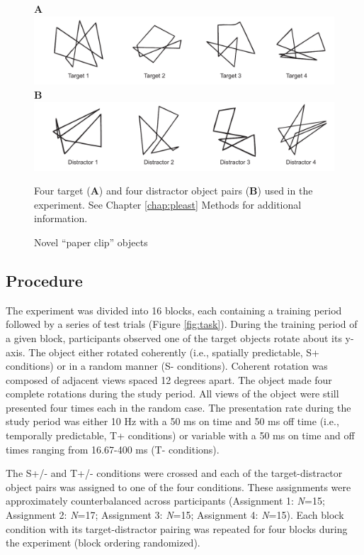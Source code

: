 \documentclass[dwyatte_dissertation.tex]{subfiles}
\begin{document}
\begin{figure}[h!]
\textbf{A} \\
\includegraphics[width=160mm]{figs/bpleast/paperclip_targets.pdf} \\
\textbf{B} \\
\includegraphics[width=160mm]{figs/bpleast/paperclip_distractors.pdf} \\
\caption{Novel ``paper clip'' objects}{Four target (\textbf{A}) and four distractor object pairs (\textbf{B}) used in the experiment. See Chapter \ref{chap:pleast} Methods for additional information.}
\label{fig:paperclip}
\end{figure}

\subsection{Procedure}
The experiment was divided into 16 blocks, each containing a training period followed by a series of test trials (Figure \ref{fig:task}). During the training period of a given block, participants observed one of the target objects rotate about its y-axis. The object either rotated coherently (i.e., spatially predictable, S+ conditions) or in a random manner (S- conditions). Coherent rotation was composed of adjacent views spaced 12 degrees apart. The object made four complete rotations during the study period. All views of the object were still presented four times each in the random case. The presentation rate during the study period was either 10 Hz with a 50 ms on time and 50 ms off time (i.e., temporally predictable, T+ conditions) or variable with a 50 ms on time and off times ranging from 16.67-400 ms (T- conditions). 

The S+/- and T+/- conditions were crossed and each of the target-distractor object pairs was assigned to one of the four conditions. These assignments were approximately counterbalanced across participants (Assignment 1: \textit{N}=15; Assignment 2: \textit{N}=17; Assignment 3: \textit{N}=15; Assignment 4: \textit{N}=15). Each block condition with its target-distractor pairing was repeated for four blocks during the experiment (block ordering randomized).
\end{document}
